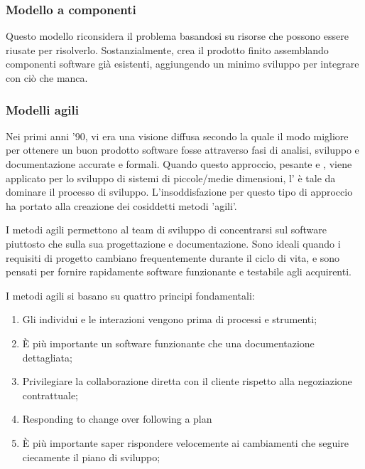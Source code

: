 
\subsubsection{Modello a componenti}

Questo modello riconsidera il problema basandosi su risorse che possono essere
riusate per risolverlo. Sostanzialmente, crea il prodotto finito assemblando
componenti software già esistenti, aggiungendo un minimo sviluppo per integrare
con ciò che manca.


\subsubsection{Modelli agili}

Nei primi anni '90, vi era una visione diffusa secondo la quale il modo migliore
per ottenere un buon prodotto software fosse attraverso fasi di analisi,
sviluppo e documentazione accurate e formali. Quando questo approccio, pesante e
, viene applicato per lo sviluppo di sistemi di
piccole/medie dimensioni, l' è tale da dominare il processo
di sviluppo. L'insoddisfazione per questo tipo di approccio ha portato alla
creazione dei cosiddetti metodi 'agili'.

I metodi agili permettono al team di sviluppo di concentrarsi sul software
piuttosto che sulla sua progettazione e documentazione. Sono ideali quando i
requisiti di progetto cambiano frequentemente durante il ciclo di vita, e sono
pensati per fornire rapidamente software funzionante e testabile agli
acquirenti.

I metodi agili si basano su quattro principi fondamentali:

\begin{enumerate}
	\item Gli individui e le interazioni vengono prima di processi e strumenti;
  \item È più importante un software funzionante che una documentazione
    dettagliata;
  \item Privilegiare la collaborazione diretta con il cliente rispetto alla
    negoziazione contrattuale;
	\item Responding to change over following a plan
  \item È più importante saper rispondere velocemente ai cambiamenti che seguire
    ciecamente il piano di sviluppo;
\end{enumerate}

